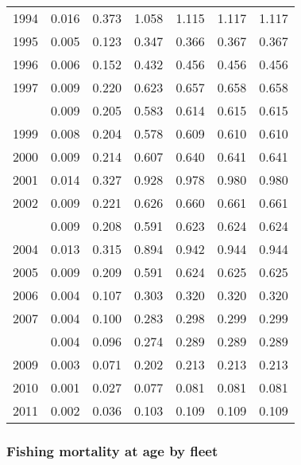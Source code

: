 \documentclass[
]{article}
\begin{document}
\begin{longtable}[t]{lrrrrrr}
1994 & 0.016 & 0.373 & 1.058 & 1.115 & 1.117 & 1.117\\
1995 & 0.005 & 0.123 & 0.347 & 0.366 & 0.367 & 0.367\\
1996 & 0.006 & 0.152 & 0.432 & 0.456 & 0.456 & 0.456\\
1997 & 0.009 & 0.220 & 0.623 & 0.657 & 0.658 & 0.658\\
\addlinespace
1998 & 0.009 & 0.205 & 0.583 & 0.614 & 0.615 & 0.615\\
1999 & 0.008 & 0.204 & 0.578 & 0.609 & 0.610 & 0.610\\
2000 & 0.009 & 0.214 & 0.607 & 0.640 & 0.641 & 0.641\\
2001 & 0.014 & 0.327 & 0.928 & 0.978 & 0.980 & 0.980\\
2002 & 0.009 & 0.221 & 0.626 & 0.660 & 0.661 & 0.661\\
\addlinespace
2003 & 0.009 & 0.208 & 0.591 & 0.623 & 0.624 & 0.624\\
2004 & 0.013 & 0.315 & 0.894 & 0.942 & 0.944 & 0.944\\
2005 & 0.009 & 0.209 & 0.591 & 0.624 & 0.625 & 0.625\\
2006 & 0.004 & 0.107 & 0.303 & 0.320 & 0.320 & 0.320\\
2007 & 0.004 & 0.100 & 0.283 & 0.298 & 0.299 & 0.299\\
\addlinespace
2008 & 0.004 & 0.096 & 0.274 & 0.289 & 0.289 & 0.289\\
2009 & 0.003 & 0.071 & 0.202 & 0.213 & 0.213 & 0.213\\
2010 & 0.001 & 0.027 & 0.077 & 0.081 & 0.081 & 0.081\\
2011 & 0.002 & 0.036 & 0.103 & 0.109 & 0.109 & 0.109\\*
\end{longtable}

\subsubsection{Fishing mortality at age by
fleet}\label{fishing-mortality-at-age-by-fleet}
\end{document}
